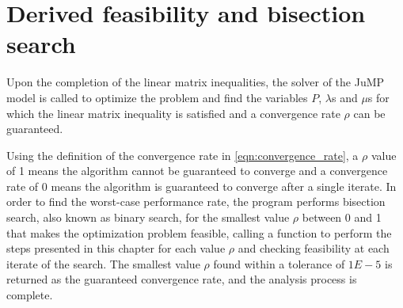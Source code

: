 \section{Derived feasibility and bisection search}
Upon the completion of the linear matrix inequalities, the solver of the JuMP model is called to optimize the problem and find the variables \texttt{$P$}, \texttt{$\lambda$}s and \texttt{$\mu$}s for which the linear matrix inequality is satisfied and a convergence rate $\rho$ can be guaranteed.

Using the definition of the convergence rate in \eqref{eqn:convergence_rate}, a \texttt{$\rho$} value of 1 means the algorithm cannot be guaranteed to converge and a convergence rate of 0 means the algorithm is guaranteed to converge after a single iterate. In order to find the worst-case performance rate, the program performs bisection search, also known as binary search, for the smallest value $\rho$ between 0 and 1 that makes the optimization problem feasible, calling a function to perform the steps presented in this chapter for each value \texttt{$\rho$} and checking feasibility at each iterate of the search. The smallest value \texttt{$\rho$} found within a tolerance of $1E-5$ is returned as the guaranteed convergence rate, and the analysis process is complete.